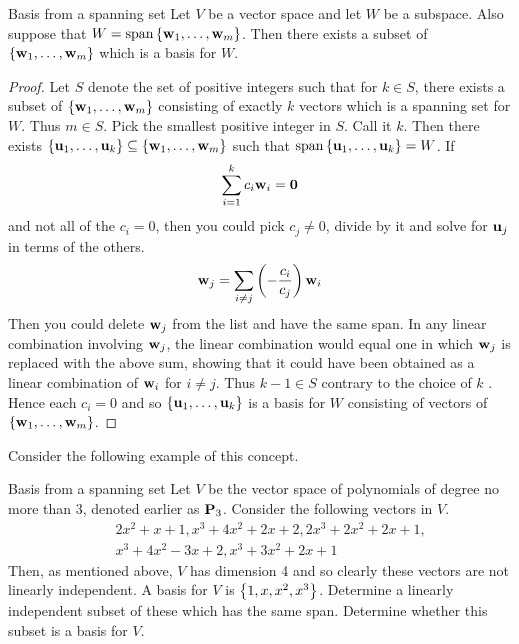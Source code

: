 \begin{theorem}{Basis from a spanning set}{}
  Let $V$ be a vector space and let $W$ be a subspace. Also suppose
  that $W=\sspan\set{\vect{w}_{1},\ldots,\vect{w} _{m}}$. Then there
  exists a subset of $\left\{\mbox{\bf w}_{1},\ldots, \mbox{\bf w}_{m}\right\} $ which
  is a basis for $W$.
\end{theorem}

\begin{proof}
  Let $S$ denote the set of positive integers such that for $ k\in S$,
  there exists a subset of $\left\{\mbox{\bf w}_{1},\ldots,\mbox{\bf w} _{m}\right\} $
  consisting of exactly $k$ vectors which is a spanning set for
  $W$. Thus $m\in S$. Pick the smallest positive integer in $S$. Call
  it $k$.  Then there exists
  $\left\{\mbox{\bf u}_{1},\ldots,\mbox{\bf u}_{k}\right\} \subseteq
  \left\{\mbox{\bf w}_{1},\ldots,\mbox{\bf w}_{m}\right\} $ such that
  $\sspan \set{\vect{u}_{1},\ldots,\vect{u}_{k}} =W$. If
  \begin{equation*}
    \sum_{i=1}^{k}c_{i}\mbox{\bf w}_{i}=\mbox{\bf 0}
  \end{equation*}
  and not all of the $c_{i}=0$, then you could pick $c_{j}\neq 0$,
  divide by it and solve for $\mbox{\bf u}_{j}$ in terms of the others.
  \begin{equation*}
    \mbox{\bf w}_{j}=\sum_{i\neq j}\left(-\frac{c_{i}}{c_{j}}\right) \mbox{\bf w}_{i}
  \end{equation*}
  Then you could delete $\mbox{\bf w}_{j}$ from the list and have the same
  span.  In any linear combination involving $\mbox{\bf w}_{j}$, the
  linear combination would equal one in which $\mbox{\bf w}_{j}$ is
  replaced with the above sum, showing that it could have been
  obtained as a linear combination of $\mbox{\bf w}_{i}$ for $i\neq
  j$. Thus $k-1\in S$ contrary to the choice of $k$ . Hence each
  $c_{i}=0$ and so $\left\{\mbox{\bf u}_{1},\ldots,\mbox{\bf u} _{k}\right\} $ is a
  basis for $W$ consisting of vectors of
  $\left\{\mbox{\bf w} _{1},\ldots,\mbox{\bf w}_{m}\right\}$.
\end{proof}

Consider the following example of this concept.

\begin{example}{Basis from a spanning set}{}
  Let $V$ be the vector space of polynomials of degree no more than 3,
  denoted earlier as $\mathbf{P}_{3}$. Consider the following vectors in
  $V$.
  \begin{eqnarray*}
    &&2x^{2}+x+1,x^{3}+4x^{2}+2x+2,2x^{3}+2x^{2}+2x+1, \\
    &&x^{3}+4x^{2}-3x+2,x^{3}+3x^{2}+2x+1
  \end{eqnarray*}
  Then, as mentioned above, $V$ has dimension 4 and so clearly these
  vectors are not linearly independent. A basis for $V$ is
  $\left\{ 1,x,x^{2},x^{3}\right\}$. Determine a linearly independent subset of
  these which has the same span. Determine whether this subset is a
  basis for $V$.
\end{example}

